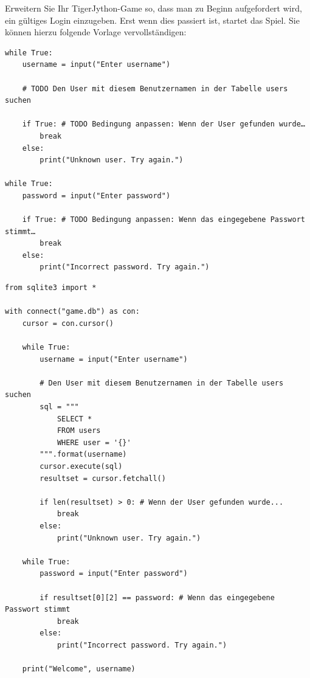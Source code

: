 \begin{myexercise}
Erweitern Sie Ihr TigerJython-Game so, dass man zu Beginn aufgefordert wird, ein gültiges Login einzugeben. Erst wenn dies passiert ist, startet das Spiel. Sie können hierzu folgende Vorlage vervollständigen:
\begin{lstlisting}
while True:
    username = input("Enter username")

    # TODO Den User mit diesem Benutzernamen in der Tabelle users suchen
    
    if True: # TODO Bedingung anpassen: Wenn der User gefunden wurde…
        break
    else:
        print("Unknown user. Try again.")

while True:
    password = input("Enter password")

    if True: # TODO Bedingung anpassen: Wenn das eingegebene Passwort stimmt…
        break
    else:
        print("Incorrect password. Try again.")
\end{lstlisting}
\begin{myanswer}
\begin{lstlisting}
from sqlite3 import *

with connect("game.db") as con:
    cursor = con.cursor()
    
    while True:
        username = input("Enter username")
    
        # Den User mit diesem Benutzernamen in der Tabelle users suchen
        sql = """
            SELECT * 
            FROM users
            WHERE user = '{}'
        """.format(username)
        cursor.execute(sql)
        resultset = cursor.fetchall()
        
        if len(resultset) > 0: # Wenn der User gefunden wurde...
            break
        else:
            print("Unknown user. Try again.")
    
    while True:
        password = input("Enter password")
    
        if resultset[0][2] == password: # Wenn das eingegebene Passwort stimmt
            break
        else:
            print("Incorrect password. Try again.")
            
    print("Welcome", username)

\end{lstlisting}
\end{myanswer}
\end{myexercise}

